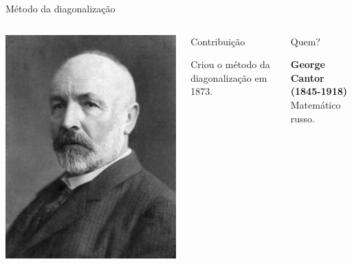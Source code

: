 \documentclass[xcolor=dvipsnames,table]{beamer}
\begin{document}
	\begin{frame}{Método da diagonalização}
		\begin{columns}
			\begin{center}
				\includegraphics[height=.6\textheight]{images/cantor.jpg}
			\end{center}
			\begin{block}{Contribuição}
				\begin{center}
					{\large Criou o método da diagonalização em 1873.}
				\end{center}
			\end{block}		  		
			\begin{block}{Quem?}
				\begin{center}
					{\bf George Cantor (1845-1918)} \\ Matemático russo.
				\end{center}
			\end{block}
		\end{columns}
	\end{frame}
	
\end{document}
